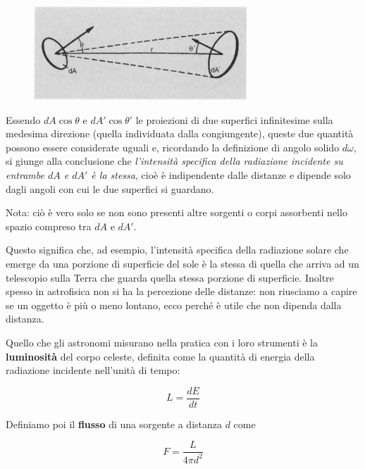 \begin{figure}[H]
   \centering
   \includegraphics[width=8cm]{immagini/intensita_specifica.png}
\end{figure}

Essendo $dA\cos{\theta}$ e $dA'\cos{\theta'}$ le proiezioni di due superfici infinitesime sulla medesima direzione (quella individuata dalla congiungente), queste due quantità possono essere considerate uguali e, ricordando la definizione di angolo solido $d\omega$, si giunge alla conclusione che \textit{l'intensità specifica della radiazione incidente su entrambe $dA$ e $dA'$ è la stessa}, cioè è indipendente dalle distanze e dipende solo dagli angoli con cui le due superfici si guardano.

\vspace{0.2cm}Nota: ciò è vero solo se non sono presenti altre sorgenti o corpi assorbenti nello spazio compreso tra $dA$ e $dA'$.

\vspace{0.2cm}Questo significa che, ad esempio, l'intensità specifica della radiazione solare che emerge da una porzione di superficie del sole è la stessa di quella che arriva ad un telescopio sulla Terra che guarda quella stessa porzione di superficie. Inoltre spesso in astrofisica non si ha la percezione delle distanze: non riusciamo a capire se un oggetto è più o meno lontano, ecco perché è utile che non dipenda dalla distanza.

\vspace{0.2cm}Quello che gli astronomi misurano nella pratica con i loro strumenti è la \textbf{luminosità} del corpo celeste, definita come la quantità di energia della radiazione incidente nell'unità di tempo:

\begin{equation}
    L=\frac{dE}{dt}
\end{equation}

Definiamo poi il \textbf{flusso} di una sorgente a distanza $d$ come

\begin{equation}
    F=\frac{L}{4\pi d^2}
\end{equation}

